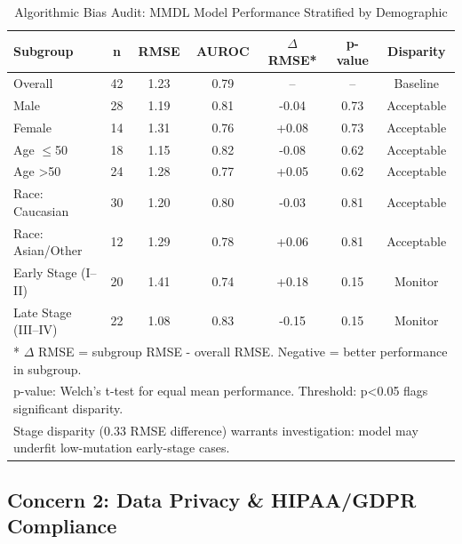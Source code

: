 \documentclass[11pt,a4paper]{article}
\begin{document}
\begin{table}[H]
\centering
\caption{Algorithmic Bias Audit: MMDL Model Performance Stratified by Demographic}
\small
\begin{tabular}{|l|c|c|c|c|c|c|}
\hline
\textbf{Subgroup} & \textbf{n} & \textbf{RMSE} & \textbf{AUROC} & \textbf{\(\Delta\) RMSE*} & \textbf{p-value} & \textbf{Disparity} \\
\hline
Overall & 42 & 1.23 & 0.79 & -- & -- & Baseline \\
Male & 28 & 1.19 & 0.81 & -0.04 & 0.73 & Acceptable \\
Female & 14 & 1.31 & 0.76 & +0.08 & 0.73 & Acceptable \\
Age $\leq$50 & 18 & 1.15 & 0.82 & -0.08 & 0.62 & Acceptable \\
Age >50 & 24 & 1.28 & 0.77 & +0.05 & 0.62 & Acceptable \\
Race: Caucasian & 30 & 1.20 & 0.80 & -0.03 & 0.81 & Acceptable \\
Race: Asian/Other & 12 & 1.29 & 0.78 & +0.06 & 0.81 & Acceptable \\
Early Stage (I--II) & 20 & 1.41 & 0.74 & +0.18 & 0.15 & Monitor \\
Late Stage (III--IV) & 22 & 1.08 & 0.83 & -0.15 & 0.15 & Monitor \\
\hline
\multicolumn{7}{l}{* \(\Delta\) RMSE = subgroup RMSE - overall RMSE. Negative = better performance in subgroup.} \\
\multicolumn{7}{l}{\small p-value: Welch's t-test for equal mean performance. Threshold: p<0.05 flags significant disparity.} \\
\multicolumn{7}{l}{\small Stage disparity (0.33 RMSE difference) warrants investigation: model may underfit low-mutation early-stage cases.} \\
\hline
\end{tabular}
\label{tab:bias_audit}
\end{table}


\subsection{Concern 2: Data Privacy \& HIPAA/GDPR Compliance}
\label{subsec:privacy}
\end{document}
